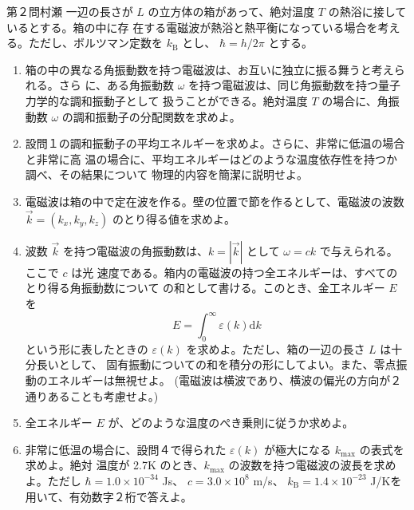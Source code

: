 \begin{question}{第２問}{村瀬}
一辺の長さが $L$ の立方体の箱があって、絶対温度 $T$ の熱浴に接しているとする。箱の中に存
在する電磁波が熱浴と熱平衡になっている場合を考える。ただし、ボルツマン定数を $k_\mathrm{B}$ とし、
$\hbar=h/2\pi$ とする。

\begin{enumerate}
\item
  箱の中の異なる角振動数を持つ電磁波は、お互いに独立に振る舞うと考えられる。さら
  に、ある角振動数 $\omega$ を持つ電磁波は、同じ角振動数を持つ量子力学的な調和振動子として
  扱うことができる。絶対温度 $T$ の場合に、角振動数 $\omega$ の調和振動子の分配関数を求めよ。
\item
  設問１の調和振動子の平均エネルギーを求めよ。さらに、非常に低温の場合と非常に高
  温の場合に、平均エネルギーはどのような温度依存性を持つか調べ、その結果について
  物理的内容を簡潔に説明せよ。
\item
  電磁波は箱の中で定在波を作る。壁の位置で節を作るとして、電磁波の波数 $\vec k=(k_x,k_y,k_z)$
  のとり得る値を求めよ。
\item
  波数 $\vec k$ を持つ電磁波の角振動数は、$k=|\vec k|$ として $\omega=ck$ で与えられる。ここで $c$ は光
  速度である。箱内の電磁波の持つ全エネルギーは、すべてのとり得る角振動数について
  の和として書ける。このとき、金工ネルギー $E$ を
  \[E=\int_0^\infty\varepsilon(k)\mathrm dk\]
  という形に表したときの $\varepsilon(k)$ を求めよ。ただし、箱の一辺の長さ $L$ は十分長いとして、
  固有振動についての和を積分の形にしてよい。また、零点振動のエネルギーは無視せよ。
  (電磁波は横波であり、横波の偏光の方向が２通りあることも考慮せよ。)
\item
  全エネルギー $E$ が、どのような温度のぺき乗則に従うか求めよ。
\item
  非常に低温の場合に、設問４で得られた $\varepsilon(k)$ が極大になる $k_\mathrm{max}$ の表式を求めよ。絶対
  温度が 2.7K のとき、$k_\mathrm{max}$ の波数を持つ電磁波の波長を求めよ。ただし $\hbar=1.0\times10^{-34}$
  Js、 $c=3.0\times10^8$ m/s、 $k_\mathrm{B}= 1.4 \times 10^{-23}$ J/Kを用いて、有効数字２桁で答えよ。
\end{enumerate}
\end{question}
